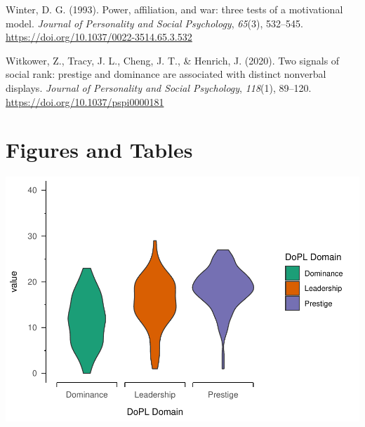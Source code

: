 \documentclass[
  english,
  ,doc, 12pt, a4paper,floatsintext]{apa7}
\newlength{\cslhangindent}
\newlength{\cslentryspacingunit} %
\newenvironment{CSLReferences}[2] %
 {%
  \setlength{\parindent}{0pt}
  \ifodd #1
  \let\oldpar\par
  \def\par{\hangindent=\cslhangindent\oldpar}
  \fi
  \setlength{\parskip}{#2\cslentryspacingunit}
 }%
 {}
\begin{document}
\begin{CSLReferences}{1}{0}
\leavevmode{}%
Winter, D. G. (1993). Power, affiliation, and war: three tests of a motivational model. \emph{Journal of Personality and Social Psychology}, \emph{65}(3), 532--545. \url{https://doi.org/10.1037/0022-3514.65.3.532}

\leavevmode{}%
Witkower, Z., Tracy, J. L., Cheng, J. T., \& Henrich, J. (2020). Two signals of social rank: prestige and dominance are associated with distinct nonverbal displays. \emph{Journal of Personality and Social Psychology}, \emph{118}(1), 89--120. \url{https://doi.org/10.1037/pspi0000181}

\end{CSLReferences}

\endgroup

\newpage

\hypertarget{figures-and-tables}{%
\section{Figures and Tables}\label{figures-and-tables}}

\includegraphics{DoPL-Experiment_files/figure-latex/unnamed-chunk-2-1.pdf}
\end{document}
